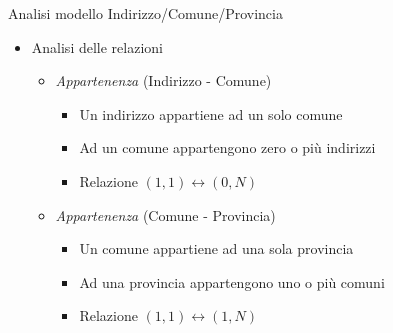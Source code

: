 \begin{frame}{Analisi modello Indirizzo/Comune/Provincia}
    \begin{itemize}
        \item Analisi delle relazioni
            \begin{itemize}
                \item \textit{Appartenenza} (Indirizzo - Comune)
                    \begin{itemize}
                        \item Un indirizzo appartiene ad un solo comune
                        \item Ad un comune appartengono zero o più indirizzi
                        \item Relazione $(1,1) \leftrightarrow (0,N)$
                    \end{itemize}
                \item \textit{Appartenenza} (Comune - Provincia)
                    \begin{itemize}
                        \item Un comune appartiene ad una sola provincia
                        \item Ad una provincia appartengono uno o più comuni
                        \item Relazione $(1,1) \leftrightarrow (1,N)$
                    \end{itemize}
            \end{itemize}
    \end{itemize}
\end{frame}

